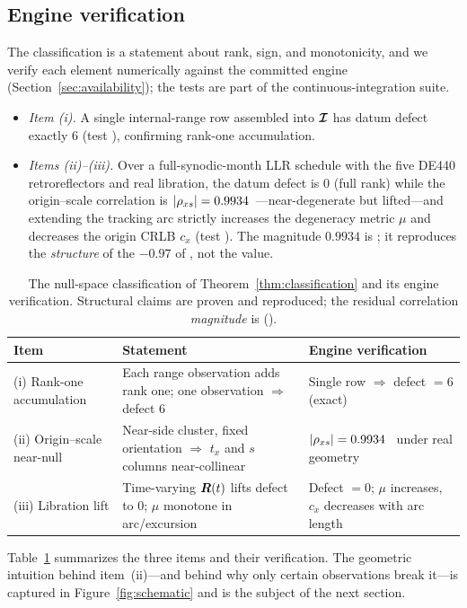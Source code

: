 \subsection{Engine verification}
\label{sec:classification-verify}

The classification is a statement about rank, sign, and monotonicity, and we verify
each element numerically against the committed  engine
(Section~\ref{sec:availability}); the tests are part of the continuous-integration
suite.

\begin{itemize}
  \item \emph{Item (i).} A single internal-range row assembled into $\bm{\mathcal{I}}$ has
  datum defect exactly $6$ (test
  ), confirming
  rank-one accumulation.
  \item \emph{Items (ii)--(iii).} Over a full-synodic-month LLR schedule with the
  five DE440 retroreflectors and real libration, the datum defect is $0$
  (full rank) while the origin--scale correlation is
  $|\rho_{x s}| = 0.9934$~\modtag---near-degenerate but lifted---and extending the
  tracking arc strictly increases the degeneracy metric $\mu$ and decreases the
  origin CRLB $c_x$ (test
  ). The
  magnitude $0.9934$ is \Modelled{}; it reproduces the \emph{structure} of the
  $-0.97$ of \citet{sosnica2025ilrf}, not the value.
\end{itemize}

\begin{table}[t]
\centering
\caption{The null-space classification of Theorem~\ref{thm:classification} and its
engine verification. Structural claims are proven and reproduced; the residual
correlation \emph{magnitude} is \Modelled{} (\modtag).}
\label{tab:classification}
\small
\begin{tabular}{@{}p{3.1cm}p{6.0cm}p{4.6cm}@{}}
\toprule
\textbf{Item} & \textbf{Statement} & \textbf{Engine verification} \\
\midrule
(i) Rank-one accumulation &
Each range observation adds rank one; one observation $\Rightarrow$ defect $6$ &
Single row $\Rightarrow$ defect $=6$ (exact) \\[2pt]
(ii) Origin--scale near-null &
Near-side cluster, fixed orientation $\Rightarrow$ $t_x$ and $s$ columns
near-collinear &
$|\rho_{x s}|=0.9934$~\modtag{} under real geometry \\[2pt]
(iii) Libration lift &
Time-varying $\bm{R}(t)$ lifts defect to $0$; $\mu$ monotone in arc/excursion &
Defect $=0$; $\mu$ increases, $c_x$ decreases with arc length \\
\bottomrule
\end{tabular}
\end{table}

\noindent Table~\ref{tab:classification} summarizes the three items and their
verification. The geometric intuition behind item~(ii)---and behind why only
certain observations break it---is captured in Figure~\ref{fig:schematic} and is
the subject of the next section.
